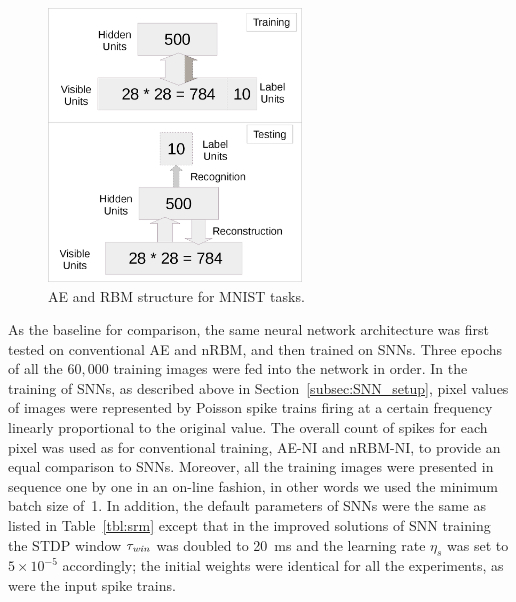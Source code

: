 \begin{figure}
	\centering
	\DIFdelbeginFL %
\DIFdelendFL \DIFaddbeginFL \includegraphics[width=0.6\textwidth]{pics_sdlm/mnist.png}
	\DIFaddendFL \caption{AE and RBM structure for MNIST tasks.}
	\label{fig:MNSIT}
\end{figure}

As the baseline for comparison, the same neural network architecture was first tested on conventional AE and nRBM, and then trained on SNNs.
Three epochs of all the $60,000$ training images were fed into the network in order.
In the training of SNNs, as described above in Section~\ref{subsec:SNN_setup}, pixel values of images were represented by Poisson spike trains firing at a certain frequency linearly proportional to the original value.
The overall count of spikes for each pixel was used as \DIFdelbegin {}\DIFdelend \DIFaddbegin {}\DIFaddend for conventional training, AE-NI and nRBM-NI, to provide an equal comparison to SNNs.
Moreover, all the training images were presented in sequence one by one in an on-line fashion, in other words we used the minimum batch size of~1.
In addition, the default parameters of SNNs were the same as listed in Table~\ref{tbl:srm} except that in the improved solutions of SNN training the STDP window $\tau_\textit{\textrm{win}}$ was doubled to 20~ms and the learning rate $\eta_s$ was set to $5 \times 10^{-5}$ accordingly;
the initial weights were identical for all the experiments, as were the input spike trains.


